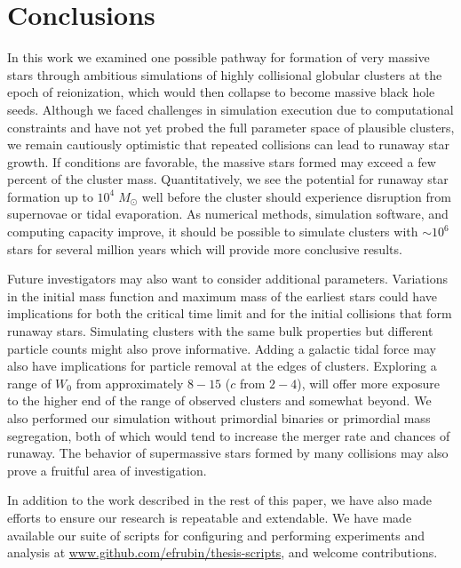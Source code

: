 \documentclass{princeton_astro_thesis}
\newcommand\Msun{\; M_\odot}
\numberwithin{equation}{section}
\begin{document}
\chapter{Conclusions} \label{ch:Conclusion}
In this work we examined one possible pathway for formation of very massive stars through ambitious simulations of highly collisional globular clusters at the epoch of reionization, which would then collapse to become massive black hole seeds.
Although we faced challenges in simulation execution due to computational constraints and have not yet probed the full parameter space of plausible clusters, we remain cautiously optimistic that repeated collisions can lead to runaway star growth. If conditions are favorable, the massive stars formed may exceed a few percent of the cluster mass.  Quantitatively, we see the potential for runaway star formation up to $10^4 \Msun$ well before the cluster should experience disruption from supernovae or tidal evaporation. As numerical methods, simulation software, and computing capacity improve, it should be possible to simulate clusters with $\sim 10^6$ stars for several million years which will provide more conclusive results.

Future investigators may also want to consider additional parameters. Variations in the initial mass function and maximum mass of the earliest stars could have implications for both the critical time limit and for the initial collisions that form runaway stars. Simulating clusters with the same bulk properties but different particle counts might also prove informative. Adding a galactic tidal force may also have implications for particle removal at the edges of clusters. Exploring a range of $W_{0}$ from approximately $8 - 15$ ($c$ from $2 - 4$), will offer more exposure to the higher end of the range of observed clusters and somewhat beyond. We also performed our simulation without primordial binaries or primordial mass segregation, both of which would tend to increase the merger rate and chances of runaway.  The behavior of supermassive stars formed by many collisions may also prove a fruitful area of investigation.

In addition to the work described in the rest of this paper, we have also made efforts to ensure our research is repeatable and extendable. We have made available our suite of scripts for configuring and performing experiments and analysis at \url{www.github.com/efrubin/thesis-scripts}, and welcome contributions.




\nocite{*}
\end{document}
